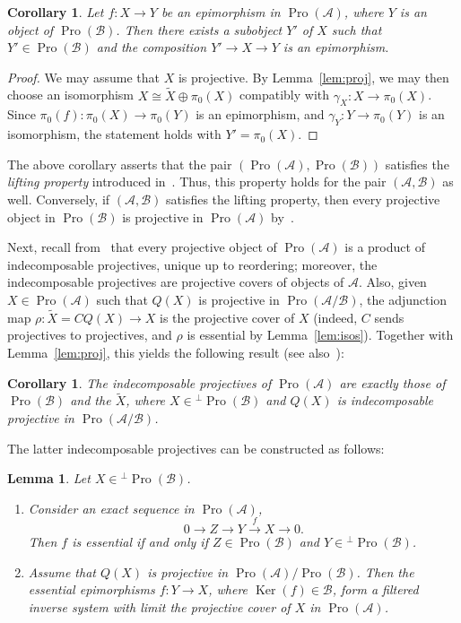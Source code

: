 \documentclass[11pt]{article}
\newtheorem{lemm}[theo]{Lemma}
\newtheorem{coro}[theo]{Corollary}
\theoremstyle{definition}
\numberwithin{equation}{section}
\newcommand\cA{{\mathcal A}}
\newcommand\cB{{\mathcal B}}
\newcommand\tX{{\widetilde X}}
\DeclareMathOperator{\Ker}{Ker}
\DeclareMathOperator{\Pro}{Pro}
\theoremstyle{remark}
\newcommand*{\romanenumi}{}%
\begin{document}
\begin{coro}\label{cor:lifting}
Let $f: X \to Y$ be an epimorphism in $\Pro(\cA)$, where $Y$ is an object of $\Pro(\cB)$. Then there exists a subobject $Y'$ of $X$ such that $Y' \in \Pro(\cB)$ and the composition $Y' \to X \to Y$ is an epimorphism.
\end{coro}

\begin{proof}
We may assume that $X$ is projective. By Lemma~\ref{lem:proj}, we may then choose an isomorphism $X \cong \tX \oplus \pi_0(X)$ compatibly with $\gamma_X : X \to \pi_0(X)$. Since $\pi_0(f) : \pi_0(X) \to \pi_0(Y)$ is an epimorphism, and $\gamma_Y : Y \to \pi_0(Y)$ is an isomorphism, the statement holds with $Y' = \pi_0(X)$.
\end{proof}

The above corollary asserts that the pair $(\Pro(\cA),\Pro(\cB))$ satisfies the \emph{lifting property} introduced in~\cite[\S 2.2]{Br17b}. Thus, this property holds for the pair $(\cA,\cB)$ as well. Conversely, if $(\cA,\cB)$ satisfies the lifting property, then every projective object in $\Pro(\cB)$ is projective in $\Pro(\cA)$ by~\cite[Lem.~2.14]{Br17b}.

Next, recall from~\cite[V.2.4]{DG} that every projective object of $\Pro(\cA)$ is a product of indecomposable projectives, unique up to reordering; moreover, the indecomposable projectives are projective covers of objects of $\cA$. Also, given $X \in \Pro(\cA)$ such that $Q(X)$ is projective in $\Pro(\cA/\cB)$, the adjunction map $\rho: \tX = CQ(X) \to X$ is the projective cover of $X$ (indeed, $C$ sends projectives to projectives, and $\rho$ is essential by Lemma~\ref{lem:isos}). Together with Lemma~\ref{lem:proj}, this yields the following result (see also~\cite[III.3.Cor.~2]{Gabriel}):

\begin{coro}\label{cor:indproj}
The indecomposable projectives of $\Pro(\cA)$ are exactly those of $\Pro(\cB)$ and the $\tX$, where $X \in {^{\perp}\Pro(\cB)}$ and $Q(X)$ is indecomposable projective in $\Pro(\cA/\cB)$.
\end{coro}

The latter indecomposable projectives can be constructed as follows:

\begin{lemm}\label{lem:ess}
Let $X \in {^{\perp}\Pro(\cB)}$.
\begin{enumerate}\romanenumi
\item \label{2.14.1} Consider an exact sequence in $\Pro(\cA)$,
\[
0 \longrightarrow Z \longrightarrow Y
\stackrel{f}{\longrightarrow} X \longrightarrow 0.
\]
Then $f$ is essential if and only if $Z \in \Pro(\cB)$ and $Y \in {^{\perp} \Pro(\cB)}$.
\item \label{2.14.2} Assume that $Q(X)$ is projective in $\Pro(\cA)/\Pro(\cB)$. Then the essential epimorphisms $f : Y \to X$, where $\Ker(f) \in \cB$, form a filtered inverse system with limit the projective cover of $X$ in $\Pro(\cA)$.
\end{enumerate}
\end{lemm}
\end{document}
